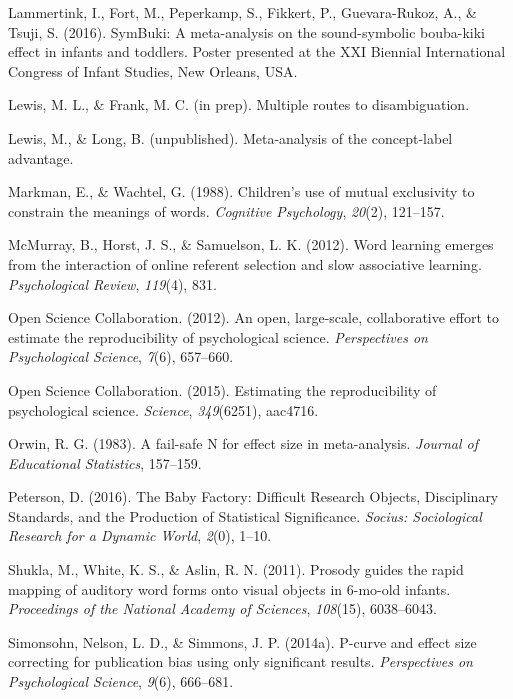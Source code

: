 \documentclass[english,floatsintext,man]{apa6}
\begin{document}
\hypertarget{ref-lammertink2016}{}
Lammertink, I., Fort, M., Peperkamp, S., Fikkert, P., Guevara-Rukoz, A.,
\& Tsuji, S. (2016). SymBuki: A meta-analysis on the sound-symbolic
bouba-kiki effect in infants and toddlers. Poster presented at the XXI
Biennial International Congress of Infant Studies, New Orleans, USA.

\hypertarget{ref-lfprep}{}
Lewis, M. L., \& Frank, M. C. (in prep). Multiple routes to
disambiguation.

\hypertarget{ref-lewisunpublished}{}
Lewis, M., \& Long, B. (unpublished). Meta-analysis of the concept-label
advantage.

\hypertarget{ref-markman1988}{}
Markman, E., \& Wachtel, G. (1988). Children's use of mutual exclusivity
to constrain the meanings of words. \emph{Cognitive Psychology},
\emph{20}(2), 121--157.

\hypertarget{ref-mcmurray2012word}{}
McMurray, B., Horst, J. S., \& Samuelson, L. K. (2012). Word learning
emerges from the interaction of online referent selection and slow
associative learning. \emph{Psychological Review}, \emph{119}(4), 831.

\hypertarget{ref-open2012open}{}
Open Science Collaboration. (2012). An open, large-scale, collaborative
effort to estimate the reproducibility of psychological science.
\emph{Perspectives on Psychological Science}, \emph{7}(6), 657--660.

\hypertarget{ref-open2015estimating}{}
Open Science Collaboration. (2015). Estimating the reproducibility of
psychological science. \emph{Science}, \emph{349}(6251), aac4716.

\hypertarget{ref-orwin1983fail}{}
Orwin, R. G. (1983). A fail-safe N for effect size in meta-analysis.
\emph{Journal of Educational Statistics}, 157--159.

\hypertarget{ref-Peterson:2016}{}
Peterson, D. (2016). The Baby Factory: Difficult Research Objects,
Disciplinary Standards, and the Production of Statistical Significance.
\emph{Socius: Sociological Research for a Dynamic World}, \emph{2}(0),
1--10.

\hypertarget{ref-shukla2011prosody}{}
Shukla, M., White, K. S., \& Aslin, R. N. (2011). Prosody guides the
rapid mapping of auditory word forms onto visual objects in 6-mo-old
infants. \emph{Proceedings of the National Academy of Sciences},
\emph{108}(15), 6038--6043.

\hypertarget{ref-simonsohn2014power}{}
Simonsohn, Nelson, L. D., \& Simmons, J. P. (2014a). P-curve and effect
size correcting for publication bias using only significant results.
\emph{Perspectives on Psychological Science}, \emph{9}(6), 666--681.
\end{document}
